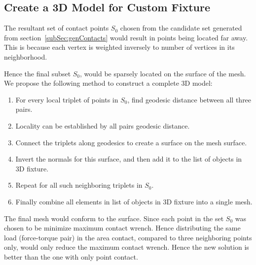\subsection{Create a 3D Model for Custom Fixture}
The resultant set of contact points $S_0$ chosen from the candidate set generated 
from section~\ref{subSec:genContacts} would result in points being located far away. This is because each vertex is weighted inversely to number of vertices in its neighborhood.

Hence the final subset $S_0$, would be sparsely located on the surface of the mesh. We propose the following method to construct a complete 3D model:
\begin{enumerate}
\item For every local triplet of points in $S_0$, find geodesic distance between all three pairs. 
\item Locality can be established by all pairs geodesic distance. 
\item Connect the triplets along geodesics to create a surface on the mesh surface. 
\item Invert the normals for this surface, and then add it to the list of objects in 3D fixture. 
\item Repeat for all such neighboring triplets in $S_0$.
\item Finally combine all elements in list of objects in 3D fixture into a single mesh. 
\end{enumerate}

The final mesh would conform to the surface. 
Since each point in the set $S_0$ was chosen to be minimize maximum contact wrench. Hence distributing the same load (force-torque pair) in the area contact, compared to three neighboring points only, would only reduce the maximum contact wrench. Hence the new solution is better than the one with only point contact.